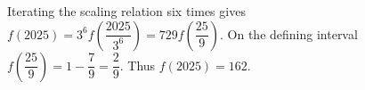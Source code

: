 Iterating the scaling relation six times gives $f(2025)=3^6f(\dfrac{2025}{3^6})=729f(\dfrac{25}{9})$. On the defining interval $f(\dfrac{25}{9})=1-\dfrac{7}{9}=\dfrac{2}{9}$. Thus $\boxed{f(2025)=162}$.
